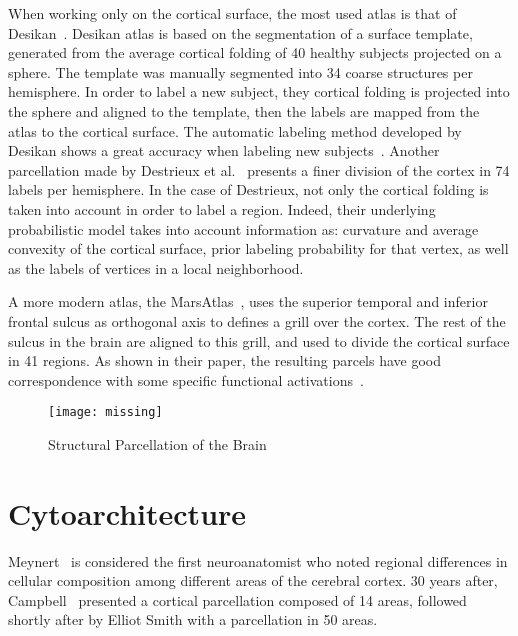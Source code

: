 When working only on the cortical surface, the most used atlas is that of
Desikan~\cite{Desikan2006}. Desikan atlas is based on the segmentation of a surface
template, generated from the average cortical folding of 40 healthy subjects
projected on a sphere. The template was manually segmented into 34 coarse 
structures per hemisphere. In order to label a new subject, they cortical 
folding is projected into the sphere and aligned to the template, then 
the labels are mapped from the atlas to the cortical surface. The automatic
labeling method developed by Desikan shows a great accuracy when labeling
new subjects~\cite{Desikan2006}. Another parcellation made by 
Destrieux et al.~\cite{Destrieux2010} presents a finer division of the cortex in
74 labels per hemisphere. In the case of Destrieux, not only the cortical
folding is taken into account in order to label a region. Indeed, their
underlying probabilistic model takes into account information as: curvature
and average convexity of the cortical surface, prior labeling probability for
that vertex, as well as the labels of vertices in a local neighborhood.

A more modern atlas, the MarsAtlas~\cite{Auzias2016}, uses the superior temporal
and inferior frontal sulcus as orthogonal axis to defines a grill over the cortex.
The rest of the sulcus in the brain are aligned to this grill, and used to divide
the cortical surface in 41 regions. As shown in their paper, the resulting parcels
have good correspondence with some specific functional activations~\cite{Auzias2016}.

\begin{figure*}[t]
    \texttt{[image: missing]}
    \caption{Structural Parcellation of the Brain}
    \label{fig:brain_function}
\end{figure*}

\section{Cytoarchitecture}
\label{sec:cytoarchitecture}

Meynert~\cite{Meynert1872} is considered the first neuroanatomist who noted
regional differences in cellular composition among different areas of the
cerebral cortex. 30 years after, Campbell~\cite{Campbell1905} presented a
cortical parcellation composed of 14 areas, followed shortly after by Elliot
Smith\cite{Smith1907} with a parcellation in 50 areas.


